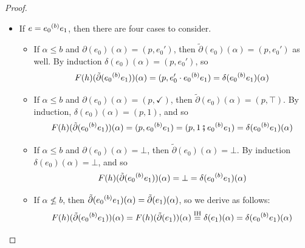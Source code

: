 \documentclass[orivec,envcountsect,envcountsame]{llncs}
\begin{document}
\begin{proof}
\begin{itemize}
		\item
		If $e = e_0 {\mathbin{^{(b)}}} e_1$, then there are four cases to consider.
		\begin{itemize}
			\item
			If $\alpha \leq b$ and $\partial(e_0)(\alpha) = (p, e_0')$, then $\tilde{\partial}(e_0)(\alpha) = (p, e_0')$ as well.
			By induction $\delta(e_0)(\alpha) = (p, e_0')$, so
			\[
			F(h)(\tilde{\partial}(e_0 {\mathbin{^{(b)}}} e_1))(\alpha)
			= (p, e_0' \cdot e_0 {\mathbin{^{(b)}}} e_1)
			= \delta(e_0 {\mathbin{^{(b)}}} e_1)(\alpha)
			\]

			\item
			If $\alpha \leq b$ and $\partial(e_0)(\alpha) = (p, \checkmark)$, then $\tilde{\partial}(e_0)(\alpha) = (p, \top)$.
			By induction, $\delta(e_0)(\alpha) = (p, 1)$, and so
			\[
			F(h)(\tilde{\partial}(e_0 {\mathbin{^{(b)}}} e_1))(\alpha)
			= (p, e_0 {\mathbin{^{(b)}}} e_1)
			= (p, 1 \fatsemi e_0 {\mathbin{^{(b)}}} e_1)
			= \delta(e_0 {\mathbin{^{(b)}}} e_1)(\alpha)
			\]

			\item
			If $\alpha \leq b$ and $\partial(e_0)(\alpha) = \bot$, then $\tilde{\partial}(e_0)(\alpha) = \bot$.
			By induction $\delta(e_0)(\alpha) = \bot$, and so
			\[
			F(h)(\tilde{\partial}(e_0 {\mathbin{^{(b)}}} e_1))(\alpha)
			= \bot
			= \delta(e_0 {\mathbin{^{(b)}}} e_1)(\alpha)
			\]

			\item
			If $\alpha \not\leq b$, then $\tilde{\partial}(e_0 {\mathbin{^{(b)}}} e_1)(\alpha) = \tilde{\partial}(e_1)(\alpha)$, so we derive as follows:
			\[
			F(h)(\tilde{\partial}(e_0 {\mathbin{^{(b)}}} e_1))(\alpha)
			= F(h)(\tilde{\partial}(e_1))(\alpha)
			\stackrel{\text{IH}}{=} \delta(e_1)(\alpha)
			= \delta(e_0 {\mathbin{^{(b)}}} e_1)(\alpha)
			\]
		\end{itemize}
	\end{itemize}
\end{proof}
\end{document}

